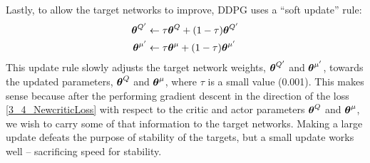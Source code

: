 Lastly, to allow the target networks to improve, DDPG uses a ``soft update'' rule:
\begin{align}
    \boldsymbol{\theta}^{Q'} &\leftarrow \tau \boldsymbol{\theta}^Q + (1-\tau) \boldsymbol{\theta}^{Q'}  \\
    \boldsymbol{\theta}^{\mu'} &\leftarrow  \tau \boldsymbol{\theta}^\mu + (1-\tau) \boldsymbol{\theta}^{\mu'} 
\end{align}
This update rule slowly adjusts the target network weights, $\boldsymbol{\theta}^{Q'}$ and $\boldsymbol{\theta}^{\mu'}$, towards the updated parameters, $\boldsymbol{\theta}^Q$ and $\boldsymbol{\theta}^\mu$, where $\tau$ is a small value (0.001). This makes sense because after the performing gradient descent in the direction of the loss \eqref{3_4_NewcriticLoss} with respect to the critic and actor parameters $\boldsymbol{\theta}^Q$ and $\boldsymbol{\theta}^\mu$, we wish to carry some of that information to the target networks. Making a large update defeats the purpose of stability of the targets, but a small update works well -- sacrificing speed for stability.

